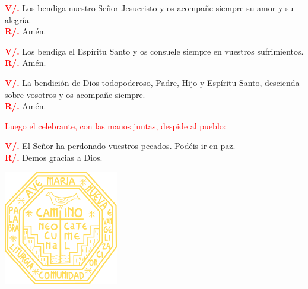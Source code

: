 \documentclass[12pt, letterpaper]{report}
\begin{document}
\noindent
\Large {\bfseries \textcolor{red}{V/.}} \hspace{0.5cm} Los bendiga nuestro Se\~nor Jesucristo y os acompa\~ne siempre su amor y su alegr\'ia.\\
\noindent
\Large {\bfseries \textcolor{red}{R/.}} \hspace{0.5cm} Am\'en.

\noindent
\Large {\bfseries \textcolor{red}{V/.}} \hspace{0.5cm} Los bendiga el Esp\'iritu Santo y os consuele siempre en vuestros sufrimientos.\\
\noindent
\Large {\bfseries \textcolor{red}{R/.}} \hspace{0.5cm} Am\'en.

\noindent
\Large {\bfseries \textcolor{red}{V/.}} \hspace{0.5cm} La bendici\'on de Dios todopoderoso, Padre, Hijo \Huge{\textcolor{red}{}} \Large y Esp\'iritu Santo, descienda sobre vosotros y os acompa\~ne siempre.\\
\noindent
\Large {\bfseries \textcolor{red}{R/.}} \hspace{0.5cm} Am\'en.

\large{\textcolor{red}{Luego el celebrante, con las manos juntas, despide al pueblo:}}

\noindent
\Large {\bfseries \textcolor{red}{V/.}} \hspace{0.5cm} El Se\~nor ha perdonado vuestros pecados. Pod\'eis ir en paz.\\
\noindent
\Large {\bfseries \textcolor{red}{R/.}} \hspace{0.5cm} Demos gracias a Dios.

\newpage

\pagecolor{red}\afterpage{\nopagecolor}

\vspace*{\fill}
\begin{center}
    \includegraphics{camino}
\end{center}
\vspace*{\fill}

\end{document}
